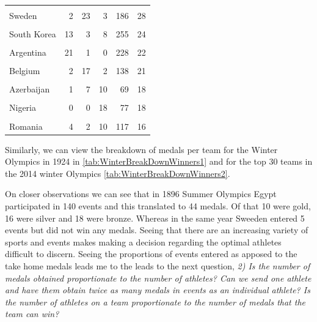 \documentclass[
]{article}
\begin{document}
\begin{table}[H]
\begin{tabular}[t]{lrrrrr}
\cellcolor{gray!10}{Jamaica} & \cellcolor{gray!10}{11} & \cellcolor{gray!10}{17} & \cellcolor{gray!10}{2} & \cellcolor{gray!10}{77} & \cellcolor{gray!10}{30}\\
Sweden & 2 & 23 & 3 & 186 & 28\\
\cellcolor{gray!10}{Croatia} & \cellcolor{gray!10}{7} & \cellcolor{gray!10}{15} & \cellcolor{gray!10}{2} & \cellcolor{gray!10}{93} & \cellcolor{gray!10}{24}\\
South Korea & 13 & 3 & 8 & 255 & 24\\
\addlinespace
\cellcolor{gray!10}{South Africa} & \cellcolor{gray!10}{2} & \cellcolor{gray!10}{7} & \cellcolor{gray!10}{14} & \cellcolor{gray!10}{155} & \cellcolor{gray!10}{23}\\
Argentina & 21 & 1 & 0 & 228 & 22\\
\cellcolor{gray!10}{Hungary} & \cellcolor{gray!10}{12} & \cellcolor{gray!10}{3} & \cellcolor{gray!10}{7} & \cellcolor{gray!10}{204} & \cellcolor{gray!10}{22}\\
Belgium & 2 & 17 & 2 & 138 & 21\\
\cellcolor{gray!10}{Norway} & \cellcolor{gray!10}{0} & \cellcolor{gray!10}{0} & \cellcolor{gray!10}{19} & \cellcolor{gray!10}{77} & \cellcolor{gray!10}{19}\\
\addlinespace
Azerbaijan & 1 & 7 & 10 & 69 & 18\\
\cellcolor{gray!10}{Kazakhstan} & \cellcolor{gray!10}{3} & \cellcolor{gray!10}{5} & \cellcolor{gray!10}{10} & \cellcolor{gray!10}{123} & \cellcolor{gray!10}{18}\\
Nigeria & 0 & 0 & 18 & 77 & 18\\
\cellcolor{gray!10}{Poland} & \cellcolor{gray!10}{3} & \cellcolor{gray!10}{3} & \cellcolor{gray!10}{10} & \cellcolor{gray!10}{285} & \cellcolor{gray!10}{16}\\
Romania & 4 & 2 & 10 & 117 & 16\\
\bottomrule
\end{tabular}
\end{table}

Similarly, we can view the breakdown of medals per team for the Winter Olympics in 1924 in \ref{tab:WinterBreakDownWinners1} and for the top 30 teams in the 2014 winter Olympics \ref{tab:WinterBreakDownWinners2}.

On closer observations we can see that in 1896 Summer Olympics Egypt participated in 140 events and this translated to 44 medals. Of that 10 were gold, 16 were silver and 18 were bronze. Whereas in the same year Sweeden entered 5 events but did not win any medals. Seeing that there are an increasing variety of sports and events makes making a decision regarding the optimal athletes difficult to discern. Seeing the proportions of events entered as apposed to the take home medals leads me to the leads to the next question, \emph{2) Is the number of medals obtained proportionate to the number of athletes? Can we send one athlete and have them obtain twice as many medals in events as an individual athlete? Is the number of athletes on a team proportionate to the number of medals that the team can win?}
\end{document}
